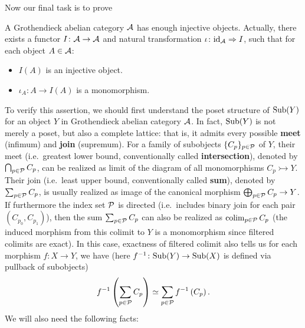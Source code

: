 \documentclass[twoside]{article}
\begin{document}
Now our final task is to prove
\begin{thm}\label{eninj}
A Grothendieck abelian category ${\mathcal{A}}$ has enough injective objects. Actually, there exists a functor $I\colon {\mathcal{A}} \rightarrow {\mathcal{A}}$ and natural transformation $\iota\colon \mathrm{id}_{\mathcal{A}} \Rightarrow I$, such that for each object $A \in {\mathcal{A}}$:
\begin{itemize}
\item $I(A)$ is an injective object.
\item $\iota_A\colon A \rightarrow I(A)$ is a monomorphism.
\end{itemize}
 \end{thm}
To verify this assertion, we should first understand the poset structure of $\mathrm{Sub}(Y)$ for an object $Y$ in Grothendieck abelian category ${\mathcal{A}}$. In fact, $\mathrm{Sub}(Y)$ is not merely a poset, but also a complete lattice: that is, it admits every possible \textbf{meet} (infimum) and \textbf{join} (supremum).  For a family of subobjects $\{C_p\}_{p \in {\mathcal{P}}}$ of $Y$, their meet (i.e.\ greatest lower bound, conventionally called \textbf{intersection}), denoted by $\bigcap_{p \in {\mathcal{P}}} C_p$,  can be realized as limit of the diagram of all monomorphisms $C_p \rightarrowtail Y$. Their join (i.e.\ least upper bound, conventionally called \textbf{sum}), denoted by $\sum_{p \in {\mathcal{P}}} C_p$, is usually realized as image of the canonical morphism $\bigoplus_{p \in {\mathcal{P}}} C_p \rightarrow Y$. If furthermore the index set ${\mathcal{P}}$ is directed (i.e.\ includes binary join for each pair $(C_{p_0}, C_{p_1})$), then the sum $\sum_{p \in {\mathcal{P}}} C_p$ can also be realized as $\operatorname*{\mathrm{colim}}_{p \in {\mathcal{P}}} C_p$ (the induced morphism from this colimit to $Y$ is a monomorphism since filtered colimits are exact). In this case, exactness of filtered colimit also tells us for each morphism $f\colon X \rightarrow Y$, we have (here $f^{-1}\colon \mathrm{Sub}(Y) \rightarrow \mathrm{Sub}(X)$ is defined via pullback of  subobjects)
$$f^{-1} \left( \sum_{p \in {\mathcal{P}}} C_p \right) \simeq \sum_{p \in {\mathcal{P}}} f^{-1} \left( C_p\right).$$
We will also need the following facts:
\end{document}
